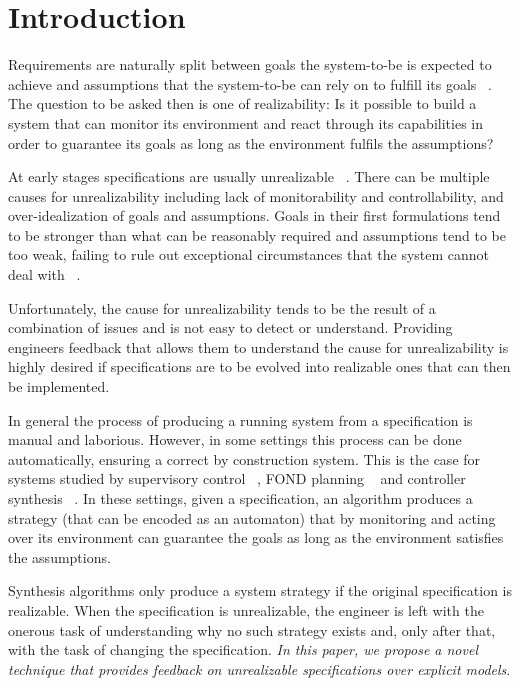 \section{Introduction}\label{sec:introduction}


Requirements are naturally split between goals the system-to-be is expected to achieve and
assumptions that the system-to-be can rely on to fulfill its goals ~\cite{Jackson:1995,Letier:2002}. The question to be asked then is one of realizability: Is it possible to build a system that can monitor its environment and react through its capabilities in order to guarantee its goals as long as the environment fulfils the assumptions?

At early stages specifications are usually unrealizable ~\cite{Letier:2002}. There can be multiple causes for unrealizability including lack of monitorability and controllability, and over-idealization of goals and assumptions. Goals in their first formulations tend to be stronger than what can be reasonably required and assumptions tend to be too weak, failing to rule out exceptional circumstances that the system cannot deal with ~\cite{vanLamsweerde:2000}. 

Unfortunately, the cause for unrealizability tends to be the result of a combination of issues and is not easy to detect or understand. Providing engineers feedback that allows them to understand the cause for unrealizability is highly desired if specifications are to be evolved into realizable ones that can then be implemented. 

In general the process of producing a running system from a specification is manual and laborious. However, in some settings this process can be done automatically, ensuring a correct by construction system. This is the case for systems studied by supervisory control ~\cite{ramadge:1989}, FOND planning ~\cite{daniele:2000} and controller synthesis ~\cite{Maoz:2014,Bloem:2012}. 
In these settings, given a specification, an algorithm produces a strategy (that can be encoded as an automaton) that by monitoring and acting over its environment can guarantee the goals as long as the environment satisfies the assumptions. 

Synthesis algorithms only produce a system strategy if the original specification is realizable. 
When the specification is unrealizable, the engineer is left with the onerous task of understanding why no such strategy exists and, only after that, with the task of changing the specification.
\emph{In this paper, we propose a novel technique that provides feedback on unrealizable specifications over explicit models}. 

